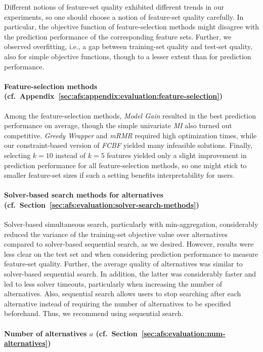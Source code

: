 \documentclass{article}
\theoremstyle{definition}
\begin{document}
Different notions of feature-set quality exhibited different trends in our experiments, so one should choose a notion of feature-set quality carefully.
In particular, the objective function of feature-selection methods might disagree with the prediction performance of the corresponding feature sets.
Further, we observed overfitting, i.e., a gap between training-set quality and test-set quality, also for simple objective functions, though to a lesser extent than for prediction performance.

\paragraph{Feature-selection methods (cf.~Appendix~\ref{sec:afs:appendix:evaluation:feature-selection})}

Among the feature-selection methods, \emph{Model Gain} resulted in the best prediction performance on average, though the simple univariate \emph{MI} also turned out competitive.
\emph{Greedy Wrapper} and \emph{mRMR} required high optimization times, while our constraint-based version of \emph{FCBF} yielded many infeasible solutions.
Finally, selecting $k=10$ instead of $k=5$ features yielded only a slight improvement in prediction performance for all feature-selection methods, so one might stick to smaller feature-set sizes if such a setting benefits interpretability for users.

\paragraph{Solver-based search methods for alternatives (cf.~Section~\ref{sec:afs:evaluation:solver-search-methods})}

Solver-based simultaneous search, particularly with min-aggregation, considerably reduced the variance of the training-set objective value over alternatives compared to solver-based sequential search, as we desired.
However, results were less clear on the test set and when considering prediction performance to measure feature-set quality.
Further, the average quality of alternatives was similar to solver-based sequential search.
In addition, the latter was considerably faster and led to less solver timeouts, particularly when increasing the number of alternatives.
Also, sequential search allows users to stop searching after each alternative instead of requiring the number of alternatives to be specified beforehand.
Thus, we recommend using sequential search.

\paragraph{Number of alternatives $a$ (cf.~Section~\ref{sec:afs:evaluation:num-alternatives})}
\end{document}
